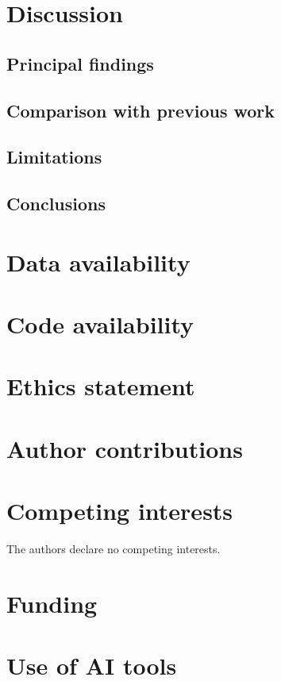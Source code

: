\documentclass{article}
\begin{document}
\section{Discussion}
\subsection{Principal findings}
\subsection{Comparison with previous work}
\subsection{Limitations}
\subsection{Conclusions}

\section*{Data availability}
\section*{Code availability}
\section*{Ethics statement}
\section*{Author contributions}
\section*{Competing interests}
The authors declare no competing interests.
\section*{Funding}
\section*{Use of AI tools}



\end{document}
